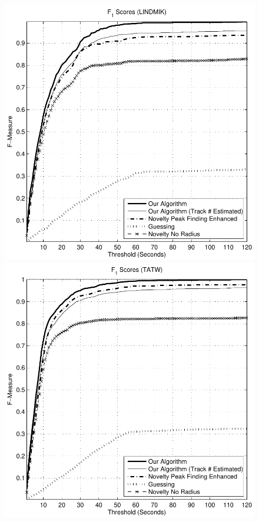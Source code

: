 \documentclass[twocolumn]{article}
\begin{document}
\begin{figure}
\begin{center}
		\begin{minipage}[t]{0.45\linewidth}
			\begin{center}
				\includegraphics[scale=0.5]{images/fscores/lindmik}
			\end{center}
		\end{minipage}
		\begin{minipage}[t]{0.45\linewidth}
			\begin{center}
				\includegraphics[scale=0.5]{images/fscores/tatw}
			\end{center}
		\end{minipage}
		

\end{center}
\end{figure}
\end{document}
